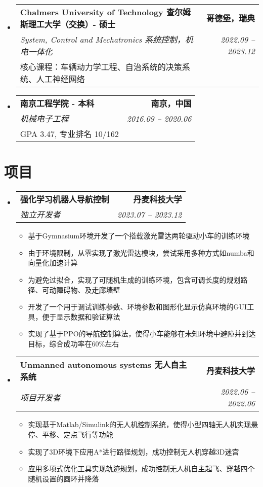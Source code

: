 \documentclass[letterpaper,11pt]{article}
\makeatletter
\newcommand{\resumeItem}[1]{
  \item\small{
    {#1 \vspace{-2pt}}
  }
}
\newcommand{\resumeSubheading}[4]{
  \vspace{-2pt}\item\small{
    \begin{tabular*}{0.97\textwidth}[t]{l@{\extracolsep{\fill}}r}
      \textbf{#1} & \textbf{#2} \\
      \textit{#3} & \textit{#4} \\
    \end{tabular*}\vspace{-7pt}
  }
}
\newcommand{\resumeSubheadingExtended}[5]{  
  \item\small{
    \begin{tabular*}{0.97\textwidth}{@{\extracolsep{\fill}}lr}
      \textbf{#1} & \textbf{#2} \\  %
      \textit{#3} & \textit{#4} \\  %
      #5 &  %
    \end{tabular*}\vspace{-10pt}
  }
}
\newcommand{\resumeSubHeadingListStart}{\begin{itemize}[leftmargin=0.15in, label={}]}
\newcommand{\resumeSubHeadingListEnd}{\end{itemize}}
\newcommand{\resumeItemListStart}{\begin{itemize}}
\newcommand{\resumeItemListEnd}{\end{itemize}\vspace{-5pt}}
\makeatother
\begin{document}
  \vspace{-1mm} %

  \resumeSubHeadingListStart
    \resumeSubheadingExtended
      {Chalmers University of Technology 查尔姆斯理工大学（交换）- 硕士}{哥德堡，瑞典}
      {System, Control and Mechatronics 系统控制，机电一体化}{2022.09 -- 2023.12}
      {核心课程：车辆动力学工程、自治系统的决策系统、人工神经网络}
  \resumeSubHeadingListEnd
  
  \vspace{-1mm} %

  \resumeSubHeadingListStart
    \resumeSubheadingExtended
      {南京工程学院 - 本科}{南京，中国}
      {机械电子工程}{2016.09 -- 2020.06}
      {GPA 3.47, 专业排名 10/162}
  \resumeSubHeadingListEnd

\section{项目}
  \resumeSubHeadingListStart

    \resumeSubheading
      {\textbf{强化学习机器人导航控制 \; \href{https://1drv.ms/v/s!Al-YZOpjHxorgslaTIu4oeTj8TYROw?e=EflSJj}{\faVideoCamera} \;  \href{https://github.com/SpartanTan/RLATR}{\faGithub}}}{丹麦科技大学}
      {独立开发者}{2023.07 -- 2023.12}
      \resumeItemListStart
        \resumeItem{基于Gymnasium环境开发了一个搭载激光雷达两轮驱动小车的训练环境}
        \resumeItem{由于环境限制，从零实现了激光雷达模块，尝试采用多种方式如numba和向量化加速计算}
        \resumeItem{为避免过拟合，实现了可随机生成的训练环境，包含可调长度的规划路径、可动障碍物、及走廊墙壁}
        \resumeItem{开发了一个用于调试训练参数、环境参数和图形化显示仿真环境的GUI工具，便于显示数据和验证算法}
        \resumeItem{实现了基于PPO的导航控制算法，使得小车能够在未知环境中避障并到达目标，综合成功率在60\%左右}
    \resumeItemListEnd
      
    \resumeSubheading
      {\textbf{Unmanned autonomous systems 无人自主系统  \; \href{https://1drv.ms/v/s!Al-YZOpjHxorgslZm5SJR7mVF_eoPw?e=4kRkvd}{\faVideoCamera} \;  \href{https://github.com/SpartanTan/31390-UAS-2022}{\faGithub}}}{丹麦科技大学}
      {项目开发者}{2022.06 -- 2022.06}
      \resumeItemListStart
        \resumeItem{实现基于Matlab/Simulink的无人机控制系统，使得小型四轴无人机实现悬停、平移、定点飞行等功能}
        \resumeItem{实现了3D环境下应用A*进行路径规划，成功控制无人机穿越3D迷宫}
        \resumeItem{应用多项式优化工具实现轨迹规划，成功控制无人机自主起飞、穿越四个随机设置的圆环并降落}
      \resumeItemListEnd
  \resumeSubHeadingListEnd
\end{document}
